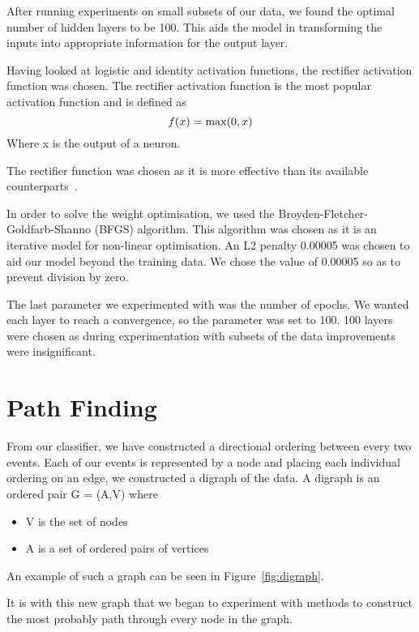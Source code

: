 \documentclass[bsc,frontabs,twoside,singlespacing,parskip,deptreport]{infthesis}     %
\begin{document}
 After running experiments on  small subsets of our data, we found the optimal number of hidden layers to be 100. 
 This aids the model in transforming the inputs into appropriate information  for the output layer.
 
 Having looked at logistic and identity activation functions, the rectifier activation function was chosen.
 The rectifier activation function is the most popular activation function \cite{lecun2015deep} and is defined as
 \begin{equation}
   f(x) = \text{max}(0,x)\nonumber\\
 \end{equation}
 Where x is the output of a neuron.
 
 The rectifier function was chosen as it is more effective than its available counterparts~\cite{glorot2011deep}.

 In order to solve the weight optimisation, we used the Broyden-Fletcher-Goldfarb-Shanno (BFGS) algorithm.
 This algorithm was chosen as it is an iterative model for non-linear optimisation.
 An L2 penalty 0.00005 was chosen to aid our model beyond the training data.
 We chose the value of 0.00005 so as to prevent division by zero. 

 The last parameter we experimented with was the number of epochs.
 We wanted each layer to reach a convergence, so the parameter was set to 100.
 100 layers were chosen as during experimentation with subsets of the data improvements were
 insignificant.

 \section{Path Finding} \label{chapter:graphing}
From our classifier, we have constructed a directional ordering between every two events.
Each of our events is represented by a node and placing each individual ordering on an edge, we constructed
a digraph of the data.
A digraph is an ordered pair G = (A,V) where~\cite{bang2008digraphs}
\begin{itemize}
  \item V is the set of nodes
  \item A is a set of ordered pairs of vertices
\end{itemize}
An example of such a graph can be seen in Figure~\ref{fig:digraph}.

It is with this new graph that we began to experiment with methods to construct the most probably path through every
node in the graph.
\end{document}
